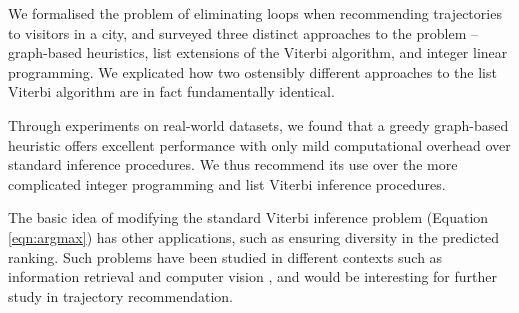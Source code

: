 
We formalised the problem of eliminating loops when recommending trajectories to visitors in a city,
and surveyed three distinct approaches to the problem --
graph-based heuristics,
list extensions of the Viterbi algorithm,
and integer linear programming.
We explicated how two ostensibly different approaches to the list Viterbi algorithm \citep{seshadri1994list,nilsson2001sequentially} are in fact fundamentally identical.

Through experiments on real-world datasets,
we found that
a greedy graph-based heuristic offers excellent performance with only mild computational overhead over standard inference procedures.
We thus recommend its use over the more complicated integer programming and list Viterbi inference procedures.



The basic idea of modifying the standard Viterbi inference problem (Equation \ref{eqn:argmax}) has other applications, such
as ensuring diversity in the predicted ranking.
Such problems have been studied in different contexts such as information retrieval \citep{Carbonell:1998} and computer vision \citep{Park:2011},
and would be interesting for further study in trajectory recommendation.

